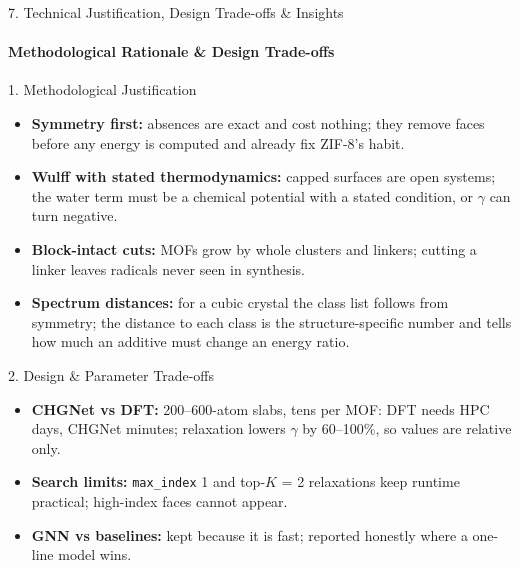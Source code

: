 \documentclass[aspectratio=169, 11pt]{beamer}
\begin{document}
\begin{frame}[shrink=5]{7. Technical Justification, Design Trade-offs \& Insights}
    \framesubtitle{Methodological Rationale \& Design Trade-offs}
    \scriptsize
    \begin{block}{1. Methodological Justification}
        \begin{itemize}
            \item \textbf{Symmetry first:} absences are exact and cost nothing; they remove faces before any energy is computed and already fix ZIF-8's habit.
            \item \textbf{Wulff with stated thermodynamics:} capped surfaces are open systems; the water term must be a chemical potential \cite{reuter2001} with a stated condition, or $\gamma$ can turn negative.
            \item \textbf{Block-intact cuts:} MOFs grow by whole clusters and linkers; cutting a linker leaves radicals never seen in synthesis.
            \item \textbf{Spectrum distances:} for a cubic crystal the class list follows from symmetry; the distance to each class is the structure-specific number and tells how much an additive must change an energy ratio.
        \end{itemize}
    \end{block}
    \begin{block}{2. Design \& Parameter Trade-offs}
        \begin{itemize}
            \item \textbf{CHGNet vs DFT:} 200--600-atom slabs, tens per MOF: DFT needs HPC days, CHGNet minutes; relaxation lowers $\gamma$ by 60--100\%, so values are relative only.
            \item \textbf{Search limits:} \texttt{max\_index} 1 and top-$K$ = 2 relaxations keep runtime practical; high-index faces cannot appear.
            \item \textbf{GNN vs baselines:} kept because it is fast; reported honestly where a one-line model wins.
        \end{itemize}
    \end{block}
\end{frame}
\end{document}
